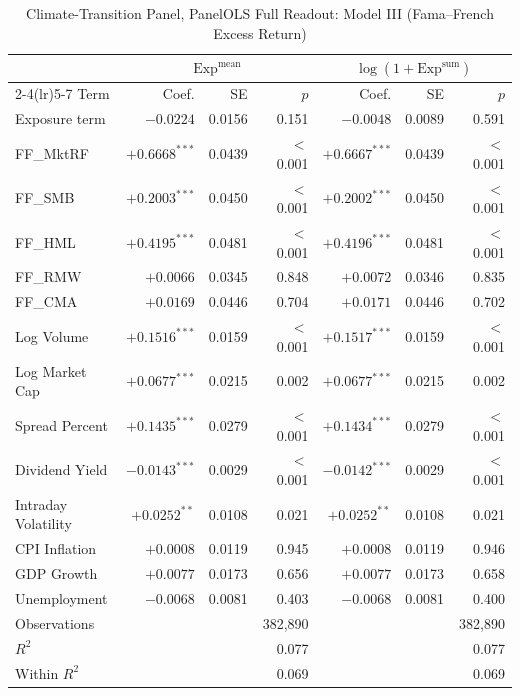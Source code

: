 \begin{table}[htbp]
\centering
\caption{Climate-Transition Panel, PanelOLS Full Readout: Model III (Fama--French Excess Return)}
\label{tab:v2_full_modelIII}
\begin{threeparttable}
\small
\setlength{\tabcolsep}{4pt}
\begin{tabular}{l r r r r r r}
\toprule
 & \multicolumn{3}{c}{$\mathrm{Exp}^{\text{mean}}$} & \multicolumn{3}{c}{$\log(1+\mathrm{Exp}^{\text{sum}})$} \\
\cmidrule(lr){2-4}\cmidrule(lr){5-7}
Term & Coef. & SE & $p$ & Coef. & SE & $p$ \\
\midrule
Exposure term & $-0.0224$ & 0.0156 & 0.151 & $-0.0048$ & 0.0089 & 0.591 \\
FF\_MktRF & $+0.6668^{***}$ & 0.0439 & $<$0.001 & $+0.6667^{***}$ & 0.0439 & $<$0.001 \\
FF\_SMB & $+0.2003^{***}$ & 0.0450 & $<$0.001 & $+0.2002^{***}$ & 0.0450 & $<$0.001 \\
FF\_HML & $+0.4195^{***}$ & 0.0481 & $<$0.001 & $+0.4196^{***}$ & 0.0481 & $<$0.001 \\
FF\_RMW & $+0.0066$ & 0.0345 & 0.848 & $+0.0072$ & 0.0346 & 0.835 \\
FF\_CMA & $+0.0169$ & 0.0446 & 0.704 & $+0.0171$ & 0.0446 & 0.702 \\
Log Volume & $+0.1516^{***}$ & 0.0159 & $<$0.001 & $+0.1517^{***}$ & 0.0159 & $<$0.001 \\
Log Market Cap & $+0.0677^{***}$ & 0.0215 & 0.002 & $+0.0677^{***}$ & 0.0215 & 0.002 \\
Spread Percent & $+0.1435^{***}$ & 0.0279 & $<$0.001 & $+0.1434^{***}$ & 0.0279 & $<$0.001 \\
Dividend Yield & $-0.0143^{***}$ & 0.0029 & $<$0.001 & $-0.0142^{***}$ & 0.0029 & $<$0.001 \\
Intraday Volatility & $+0.0252^{**}$ & 0.0108 & 0.021 & $+0.0252^{**}$ & 0.0108 & 0.021 \\
CPI Inflation & $+0.0008$ & 0.0119 & 0.945 & $+0.0008$ & 0.0119 & 0.946 \\
GDP Growth & $+0.0077$ & 0.0173 & 0.656 & $+0.0077$ & 0.0173 & 0.658 \\
Unemployment & $-0.0068$ & 0.0081 & 0.403 & $-0.0068$ & 0.0081 & 0.400 \\
\midrule
Observations & & & 382,890 & & & 382,890 \\
$R^2$ & & & 0.077 & & & 0.077 \\
Within $R^2$ & & & 0.069 & & & 0.069 \\

\end{tabular}
\end{threeparttable}
\end{table}
